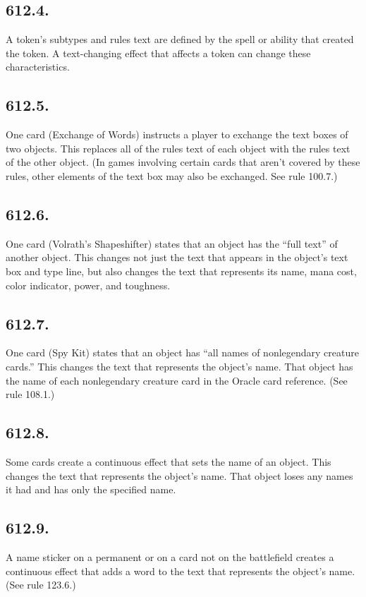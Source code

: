 \subsection*{612.4.}
A token’s subtypes and rules text are defined by the spell or ability that created the token. A text-changing effect that affects a token can change these characteristics.

\subsection*{612.5.}
One card (Exchange of Words) instructs a player to exchange the text boxes of two objects. This replaces all of the rules text of each object with the rules text of the other object. (In games involving certain cards that aren’t covered by these rules, other elements of the text box may also be exchanged. See rule 100.7.)

\subsection*{612.6.}
One card (Volrath’s Shapeshifter) states that an object has the “full text” of another object. This changes not just the text that appears in the object’s text box and type line, but also changes the text that represents its name, mana cost, color indicator, power, and toughness.

\subsection*{612.7.}
One card (Spy Kit) states that an object has “all names of nonlegendary creature cards.” This changes the text that represents the object’s name. That object has the name of each nonlegendary creature card in the Oracle card reference. (See rule 108.1.)

\subsection*{612.8.}
Some cards create a continuous effect that sets the name of an object. This changes the text that represents the object’s name. That object loses any names it had and has only the specified name.

\subsection*{612.9.}
A name sticker on a permanent or on a card not on the battlefield creates a continuous effect that adds a word to the text that represents the object’s name. (See rule 123.6.)

